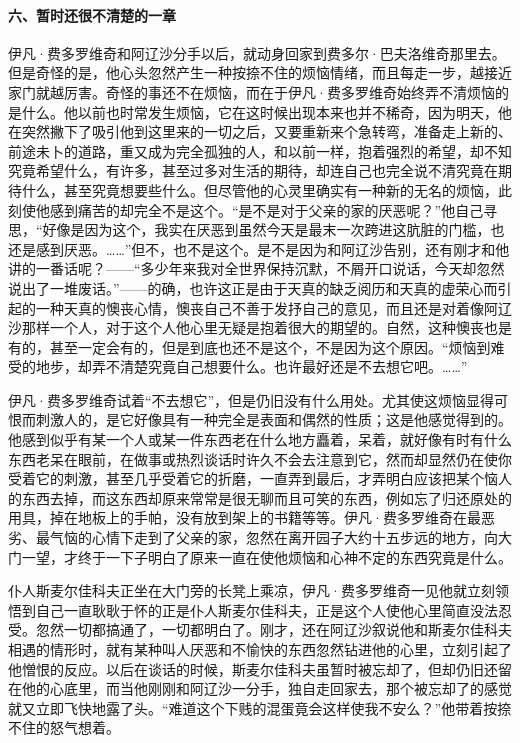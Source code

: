 \paragraph*{六、暂时还很不清楚的一章}
\par 伊凡·费多罗维奇和阿辽沙分手以后，就动身回家到费多尔·巴夫洛维奇那里去。但是奇怪的是，他心头忽然产生一种按捺不住的烦恼情绪，而且每走一步，越接近家门就越厉害。奇怪的事还不在烦恼，而在于伊凡·费多罗维奇始终弄不清烦恼的是什么。他以前也时常发生烦恼，它在这时候出现本来也并不稀奇，因为明天，他在突然撇下了吸引他到这里来的一切之后，又要重新来个急转弯，准备走上新的、前途未卜的道路，重又成为完全孤独的人，和以前一样，抱着强烈的希望，却不知究竟希望什么，有许多，甚至过多对生活的期待，却连自己也完全说不清究竟在期待什么，甚至究竟想要些什么。但尽管他的心灵里确实有一种新的无名的烦恼，此刻使他感到痛苦的却完全不是这个。“是不是对于父亲的家的厌恶呢？”他自己寻思，“好像是因为这个，我实在厌恶到虽然今天是最末一次跨进这肮脏的门槛，也还是感到厌恶。……”但不，也不是这个。是不是因为和阿辽沙告别，还有刚才和他讲的一番话呢？——“多少年来我对全世界保持沉默，不屑开口说话，今天却忽然说出了一堆废话。”——的确，也许这正是由于天真的缺乏阅历和天真的虚荣心而引起的一种天真的懊丧心情，懊丧自己不善于发抒自己的意见，而且还是对着像阿辽沙那样一个人，对于这个人他心里无疑是抱着很大的期望的。自然，这种懊丧也是有的，甚至一定会有的，但是到底也还不是这个，不是因为这个原因。“烦恼到难受的地步，却弄不清楚究竟自己想要什么。也许最好还是不去想它吧。……”
\par 伊凡·费多罗维奇试着“不去想它”，但是仍旧没有什么用处。尤其使这烦恼显得可恨而刺激人的，是它好像具有一种完全是表面和偶然的性质；这是他感觉得到的。他感到似乎有某一个人或某一件东西老在什么地方矗着，呆着，就好像有时有什么东西老呆在眼前，在做事或热烈谈话时许久不会去注意到它，然而却显然仍在使你受着它的刺激，甚至几乎受着它的折磨，一直弄到最后，才弄明白应该把某个恼人的东西去掉，而这东西却原来常常是很无聊而且可笑的东西，例如忘了归还原处的用具，掉在地板上的手帕，没有放到架上的书籍等等。伊凡·费多罗维奇在最恶劣、最气恼的心情下走到了父亲的家，忽然在离开园子大约十五步远的地方，向大门一望，才终于一下子明白了原来一直在使他烦恼和心神不定的东西究竟是什么。
\par 仆人斯麦尔佳科夫正坐在大门旁的长凳上乘凉，伊凡·费多罗维奇一见他就立刻领悟到自己一直耿耿于怀的正是仆人斯麦尔佳科夫，正是这个人使他心里简直没法忍受。忽然一切都搞通了，一切都明白了。刚才，还在阿辽沙叙说他和斯麦尔佳科夫相遇的情形时，就有某种叫人厌恶和不愉快的东西忽然钻进他的心里，立刻引起了他憎恨的反应。以后在谈话的时候，斯麦尔佳科夫虽暂时被忘却了，但却仍旧还留在他的心底里，而当他刚刚和阿辽沙一分手，独自走回家去，那个被忘却了的感觉就又立即飞快地露了头。“难道这个下贱的混蛋竟会这样使我不安么？”他带着按捺不住的怒气想着。
